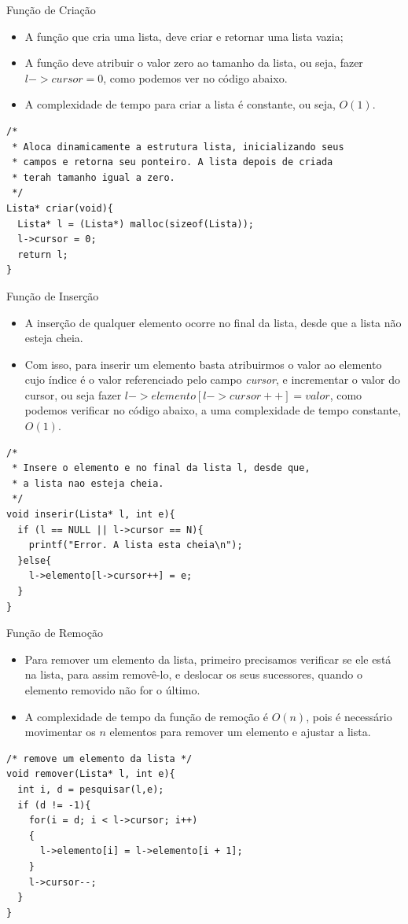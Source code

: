\begin{frame}[fragile]{Função de Criação}
	\begin{itemize}
		\item A função que cria uma lista, deve criar e retornar uma lista vazia;
		\item A função deve atribuir o valor zero ao tamanho da lista, ou seja, fazer $l->cursor = 0$, como podemos ver no código abaixo.
		\item A complexidade de tempo para criar a lista é constante, ou seja, $O(1)$.
	\end{itemize}
\begin{verbatim}
/*
 * Aloca dinamicamente a estrutura lista, inicializando seus
 * campos e retorna seu ponteiro. A lista depois de criada
 * terah tamanho igual a zero.
 */
Lista* criar(void){
  Lista* l = (Lista*) malloc(sizeof(Lista));
  l->cursor = 0;
  return l;
}
\end{verbatim}
\end{frame}

\begin{frame}[fragile]{Função de Inserção}  
	\begin{itemize}
		\item A inserção de qualquer elemento ocorre no final da lista, desde que a lista não esteja cheia.
		\item Com isso, para inserir um elemento basta atribuirmos o valor ao elemento cujo índice é o valor referenciado pelo campo \textit{cursor}, e incrementar o valor do cursor, ou seja fazer $l->elemento[l->cursor++] = valor$, como podemos verificar no código abaixo, a uma complexidade de tempo constante, $O(1)$.
	\end{itemize}

\footnotesize
\begin{lstlisting}
/*
 * Insere o elemento e no final da lista l, desde que,
 * a lista nao esteja cheia.
 */
void inserir(Lista* l, int e){
  if (l == NULL || l->cursor == N){
    printf("Error. A lista esta cheia\n");
  }else{
    l->elemento[l->cursor++] = e;
  }
}
\end{lstlisting}	
\end{frame}

\begin{frame}[fragile]{Função de Remoção} 
	\begin{itemize}
		\item Para remover um elemento da lista, primeiro precisamos verificar se ele está na lista, para assim removê-lo, e deslocar os seus sucessores, quando o elemento removido não for o último.
		\item A complexidade de tempo da função de remoção é $O(n)$, pois é necessário movimentar os $n$ elementos para remover um elemento e ajustar a lista.
	\end{itemize}
	
\footnotesize
\begin{lstlisting}
/* remove um elemento da lista */
void remover(Lista* l, int e){     
  int i, d = pesquisar(l,e);
  if (d != -1){
    for(i = d; i < l->cursor; i++)
    {
      l->elemento[i] = l->elemento[i + 1];
    }
    l->cursor--;
  }  
}
\end{lstlisting}	
\end{frame} 

